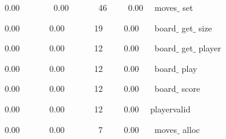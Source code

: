 \documentclass[a4paper,12pt]{article}
\begin{document}
\noindent \begin{justify}
~ \hspace*{0.49in}\hspace*{0.49in}\hspace*{0.49in}0.00~~~~~~~~0.00~~~~~~~46~~~~~0.00~~    moves$ \_ $ set
\end{justify}\par


\noindent \begin{justify}
~ \hspace*{0.49in}\hspace*{0.49in}\hspace*{0.49in}0.00~~~~~~~0.00~~~~~~~19~~~~~0.00~~~    board$ \_ $ get$ \_ $ size
\end{justify}\par


\noindent \begin{justify}
~ \hspace*{0.49in}\hspace*{0.49in}\hspace*{0.49in}0.00~~~~~~~0.00~~~~~~~12~~~~~0.00~~~    board$ \_ $ get$ \_ $ player
\end{justify}\par


\noindent \begin{justify}
~ \hspace*{0.49in}\hspace*{0.49in}\hspace*{0.49in}0.00~~~~~~~0.00~~~~~~~12~~~~~0.00~~~    board$ \_ $ play
\end{justify}\par


\noindent \begin{justify}
~ \hspace*{0.49in}\hspace*{0.49in}\hspace*{0.49in}0.00~~~~~~~0.00~~~~~~~12~~~~~0.00~~~    board$ \_ $ score
\end{justify}\par


\noindent \begin{justify}
~ \hspace*{0.49in}\hspace*{0.49in}\hspace*{0.49in}0.00~~~~~~~0.00~~~~~~~12~~~~~0.00~~    playervalid
\end{justify}\par


\noindent \begin{justify}
~ \hspace*{0.49in}\hspace*{0.49in}\hspace*{0.49in}0.00~~~~~~~0.00~~~~~~~~7~~~~~0.00~~~    moves$ \_ $ alloc
\end{justify}\par


\vspace{\baselineskip}

\vspace{\baselineskip}
\end{document}
